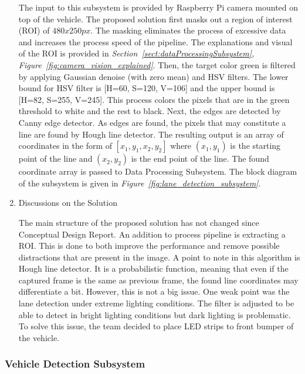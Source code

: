 \documentclass[a4paper,12pt]{article}
\begin{document}
\begin{enumerate}
The input to this subsystem is provided by Raspberry Pi camera mounted on top of the vehicle. The proposed solution first masks out a region of interest (ROI) of $480x250 px$. The masking eliminates the process of excessive data and increases the process speed of the pipeline. The explanations and visual of the ROI is provided in \textit{Section~\ref{sect:dataProcessingSubsystem}, Figure~\ref{fig:camera_vision_explained}}. Then, the target color green is filtered by applying Gaussian denoise (with zero mean) and HSV filters. The lower bound for HSV filter is [H=60, S=120, V=106] and the upper bound is [H=82, S=255, V=245]. This process colors the pixels that are in the green threshold to white and the rest to black. Next, the edges are detected by Canny edge detector. As edges are found, the pixels that may constitute a line are found by Hough line detector. The resulting output is an array of coordinates in the form of $[x_1, y_1, x_2, y_2]$ where $(x_1, y_1)$ is the starting point of the line and $(x_2, y_2)$ is the end point of the line. The found coordinate array is passed to Data Processing Subsystem. The block diagram of the subsystem is given in \textit{Figure~\ref{fig:lane_detection_subsystem}}.



\item {Discussions on the Solution}


The main structure of the proposed solution has not changed since Conceptual Design Report. An addition to process pipeline is extracting a ROI. This is done to both improve the performance and remove possible distractions that are present in the image. A point to note in this algorithm is Hough line detector. It is a probabilistic function, meaning that even if the captured frame is the same as previous frame, the found line coordinates may differentiate a bit. However, this is not a big issue. One weak point was the lane detection under extreme lighting conditions. The filter is adjusted to be able to detect in bright lighting conditions but dark lighting is problematic. To solve this issue, the team decided to place LED strips to front bumper of the vehicle.


\end{enumerate}


\subsubsection{Vehicle Detection Subsystem}
\end{document}
